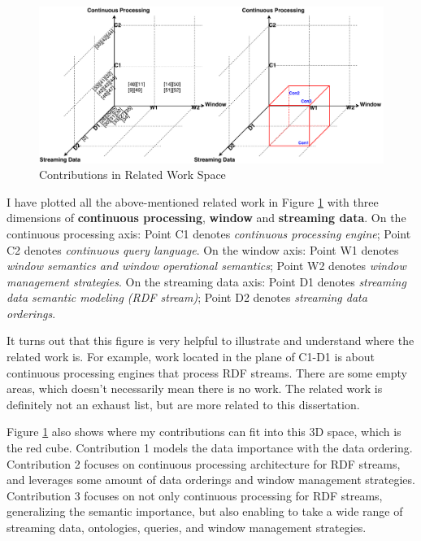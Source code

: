 \begin{figure}[!htbp]
	\centering
    \includegraphics[width=5in]{img/2-rwc.pdf}
    \caption{Contributions in Related Work Space}
    \label{fig:2-rwc}
\end{figure}

I have plotted all the above-mentioned related work in Figure \ref{fig:2-rwc} with three dimensions of  \textbf{continuous processing}, \textbf{window} and \textbf{streaming data}.
On the continuous processing axis: 
Point C1 denotes \textit{continuous processing engine};
Point C2 denotes \textit{continuous query language}.
On the window axis:
Point W1 denotes \textit{window semantics and window operational semantics};
Point W2 denotes \textit{window management strategies}.
On the streaming data axis:
Point D1 denotes \textit{streaming data semantic modeling (RDF stream)};
Point D2 denotes \textit{streaming data orderings}.

It turns out that this figure is very helpful to illustrate and understand where the related work is. 
For example, work located in the plane of C1-D1 is about continuous processing engines that process RDF streams. 
There are some empty areas, which doesn't necessarily mean there is no work. 
The related work is definitely not an exhaust list, but are more related to this dissertation. 

Figure \ref{fig:2-rwc} also shows where my contributions can fit into this 3D space, which is the red cube. 
Contribution 1 models the data importance with the data ordering.
Contribution 2 focuses on continuous processing architecture for RDF streams, and leverages some amount of data orderings and window management strategies. 
Contribution 3 focuses on not only continuous processing for RDF streams, generalizing the semantic importance, but also enabling to take a wide range of streaming data, ontologies, queries, and window management strategies.
